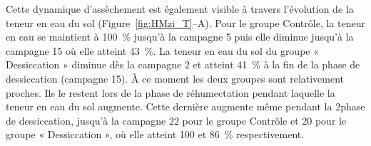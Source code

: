 Cette dynamique d'assèchement est également visible à travers l'évolution de la teneur en eau du sol (Figure~\ref{fig:HMzi_T}--A).
Pour le groupe Contrôle, la teneur en eau se maintient à \SI{100}{\percent} jusqu'à la campagne 5 puis elle diminue jusqu'à la campagne 15 où elle atteint \SI{43}{\percent}.
La teneur en eau du sol du groupe « Dessiccation » diminue dès la campagne 2 et atteint \SI{41}{\percent} à la fin de la phase de dessiccation (campagne 15).
À ce moment les deux groupes sont relativement proches.
Ils le restent lors de la phase de réhumectation pendant laquelle la teneur en eau du sol augmente.
Cette dernière augmente même pendant la 2\ieme phase de dessiccation, jusqu'à la campagne 22 pour le groupe Contrôle et 20 pour le groupe « Dessiccation », où elle atteint 100 et \SI{86}{\percent} respectivement.


